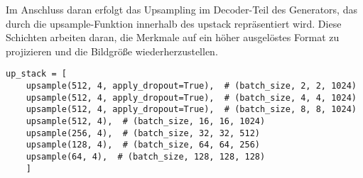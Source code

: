 Im Anschluss daran erfolgt das Upsampling im Decoder-Teil des Generators, das durch die upsample-Funktion innerhalb des upstack repräsentiert wird. Diese Schichten arbeiten daran, die Merkmale auf ein höher ausgelöstes Format zu projizieren und die Bildgröße wiederherzustellen.

\begin{lstlisting}[language=pyhaff, caption={Upsampling-Schritt}, label={cod:Pix2PixGAN Generator}]
	up_stack = [
	upsample(512, 4, apply_dropout=True),  # (batch_size, 2, 2, 1024)
	upsample(512, 4, apply_dropout=True),  # (batch_size, 4, 4, 1024)
	upsample(512, 4, apply_dropout=True),  # (batch_size, 8, 8, 1024)
	upsample(512, 4),  # (batch_size, 16, 16, 1024)
	upsample(256, 4),  # (batch_size, 32, 32, 512)
	upsample(128, 4),  # (batch_size, 64, 64, 256)
	upsample(64, 4),  # (batch_size, 128, 128, 128)
	]
\end{lstlisting}

